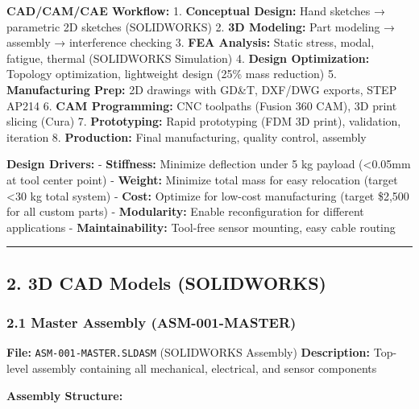 \documentclass[
]{article}
\begin{document}
\textbf{CAD/CAM/CAE Workflow:} 1. \textbf{Conceptual Design:} Hand
sketches → parametric 2D sketches (SOLIDWORKS) 2. \textbf{3D Modeling:}
Part modeling → assembly → interference checking 3. \textbf{FEA
Analysis:} Static stress, modal, fatigue, thermal (SOLIDWORKS
Simulation) 4. \textbf{Design Optimization:} Topology optimization,
lightweight design (25\% mass reduction) 5. \textbf{Manufacturing Prep:}
2D drawings with GD\&T, DXF/DWG exports, STEP AP214 6. \textbf{CAM
Programming:} CNC toolpaths (Fusion 360 CAM), 3D print slicing (Cura) 7.
\textbf{Prototyping:} Rapid prototyping (FDM 3D print), validation,
iteration 8. \textbf{Production:} Final manufacturing, quality control,
assembly

\textbf{Design Drivers:} - \textbf{Stiffness:} Minimize deflection under
5 kg payload (\textless0.05mm at tool center point) - \textbf{Weight:}
Minimize total mass for easy relocation (target \textless30 kg total
system) - \textbf{Cost:} Optimize for low-cost manufacturing (target
\$2,500 for all custom parts) - \textbf{Modularity:} Enable
reconfiguration for different applications - \textbf{Maintainability:}
Tool-free sensor mounting, easy cable routing

\begin{center}\rule{0.5\linewidth}{0.5pt}\end{center}

\hypertarget{d-cad-models-solidworks}{%
\subsection{2. 3D CAD Models
(SOLIDWORKS)}\label{d-cad-models-solidworks}}

\hypertarget{master-assembly-asm-001-master}{%
\subsubsection{2.1 Master Assembly
(ASM-001-MASTER)}\label{master-assembly-asm-001-master}}

\textbf{File:} \texttt{ASM-001-MASTER.SLDASM} (SOLIDWORKS Assembly)
\textbf{Description:} Top-level assembly containing all mechanical,
electrical, and sensor components

\textbf{Assembly Structure:}
\end{document}

